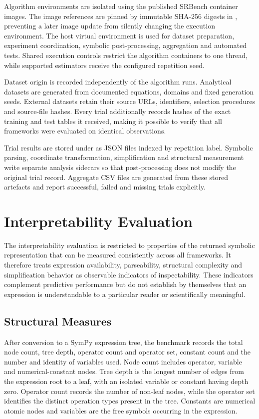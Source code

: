 \documentclass[12pt,oneside,bibtotoc,liststotoc]{scrbook}
\begin{document}
Algorithm environments are isolated using the published SRBench container images. The image references are pinned by immutable SHA-256 digests in , preventing a later image update from silently changing the execution environment. The host virtual environment is used for dataset preparation, experiment coordination, symbolic post-processing, aggregation and automated tests. Shared execution controls restrict the algorithm containers to one thread, while supported estimators receive the configured repetition seed.

Dataset origin is recorded independently of the algorithm runs. Analytical datasets are generated from documented equations, domains and fixed generation seeds. External datasets retain their source URLs, identifiers, selection procedures and source-file hashes. Every trial additionally records hashes of the exact training and test tables it received, making it possible to verify that all frameworks were evaluated on identical observations.

Trial results are stored under  as JSON files indexed by repetition label. Symbolic parsing, coordinate transformation, simplification and structural measurement write separate analysis sidecars so that post-processing does not modify the original trial record. Aggregate CSV files are generated from these stored artefacts and report successful, failed and missing trials explicitly.

\section{Interpretability Evaluation}

The interpretability evaluation is restricted to properties of the returned symbolic representation that can be measured consistently across all frameworks. It therefore treats expression availability, parseability, structural complexity and simplification behavior as observable indicators of inspectability. These indicators complement predictive performance but do not establish by themselves that an expression is understandable to a particular reader or scientifically meaningful.

\subsection{Structural Measures}

After conversion to a SymPy expression tree, the benchmark records the total node count, tree depth, operator count and operator set, constant count and the number and identity of variables used. Node count includes operator, variable and numerical-constant nodes. Tree depth is the longest number of edges from the expression root to a leaf, with an isolated variable or constant having depth zero. Operator count records the number of non-leaf nodes, while the operator set identifies the distinct operation types present in the tree. Constants are numerical atomic nodes and variables are the free symbols occurring in the expression.
\end{document}
